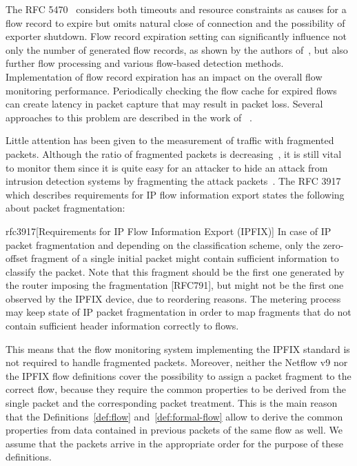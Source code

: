 The RFC 5470~\cite{rfc5470} considers both timeouts and resource constraints as causes for a flow record to expire but omits natural close of connection and the possibility of exporter shutdown. Flow record expiration setting can significantly influence not only the number of generated flow records, as shown by the authors of~\cite{Rodriguez-2013-Empirical}, but also further flow processing and various flow-based detection methods. Implementation of flow record expiration has an impact on the overall flow monitoring performance. Periodically checking the flow cache for expired flows can create latency in packet capture that may result in packet loss. Several approaches to this problem are described in the work of \citeauthor{Molina-2006-Design}~\cite{Molina-2006-Design}.


Little attention has been given to the measurement of traffic with fragmented packets. Although the ratio of fragmented packets is decreasing~\cite{Murray-2012-State}, it is still vital to monitor them since it is quite easy for an attacker to hide an attack from intrusion detection systems by fragmenting the attack packets~\cite{Cheng-2012-Evasion}. The RFC 3917 which describes requirements for IP flow information export states the following about packet fragmentation:

\begin{displaycquote}{rfc3917}[Requirements for IP Flow Information Export (IPFIX)]
   In case of IP packet fragmentation and depending on the
   classification scheme, only the zero-offset fragment of a single
   initial packet might contain sufficient information to classify the
   packet.  Note that this fragment should be the first one generated by
   the router imposing the fragmentation [RFC791], but might not be the
   first one observed by the IPFIX device, due to reordering reasons.
   The metering process may keep state of IP packet fragmentation in
   order to map fragments that do not contain sufficient header
   information correctly to flows.
\end{displaycquote}

This means that the flow monitoring system implementing the IPFIX standard is not required to handle fragmented packets. Moreover, neither the Netflow v9 nor the IPFIX flow definitions cover the possibility to assign a packet fragment to the correct flow, because they require the common properties to be derived from the single packet and the corresponding packet treatment. This is the main reason that the Definitions~\ref{def:flow} and~\ref{def:formal-flow} allow to derive the common properties from data contained in previous packets of the same flow as well. We assume that the packets arrive in the appropriate order for the purpose of these definitions.


